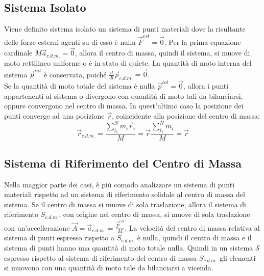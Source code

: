 \documentclass{article}
\numberwithin{equation}{subsection}
\begin{document}
\subsection{Sistema Isolato}
Viene definito sistema isolato un sistema di punti materiali dove la risultante delle 
forze esterni agenti su di esso è nulla $\vec{F}^{est}=\vec{0}$. 
Per la prima equazione cardinale $M\vec{a}_{c.d.m.}=\vec{0}$, allora il centro di massa, quindi il sistema, si muove di moto rettilineo 
uniforme o è in stato di quiete. La quantità di moto interna del sistema $\vec{p}^{int}$ 
è conservata, poiché $\displaystyle\frac{d}{dt}\vec{p}_{c.d.m.}=\vec{0}$.
\\
Se la quantità di moto totale del sistema è nulla $\vec{p}^{tot}=\vec{0}$, allora 
i punti appartenenti al sistema o divergono con quantità di 
moto tali da bilanciarsi, oppure convergono nel centro di 
massa. In quest'ultimo caso la posizione dei punti converge 
ad una posizione $\vec{r}$, coincidente alla posizione del centro di massa:
\begin{equation}
    \vec{r}_{c.d.m.}=\displaystyle\frac{\sum_{i_1}^{N}m_i\vec{r}_i}{M}=\vec{r}\frac{\sum_{i_1}^{N}m_i}{M}=\vec{r}
\end{equation}

\subsection{Sistema di Riferimento del Centro di Massa}
Nella maggior parte dei casi, è più comodo analizzare un sistema di punti materiali rispetto ad un sistema di riferimento solidale al centro di massa del sistema. 
Se il centro di massa si muove di sola traslazione, allora
il sistema di riferimento $S_{c.d.m.}$, con origine nel centro 
di massa, si muove di sola traslazione con un'accellerazione 
$\vec{A}=\vec{a}_{c.d.m.}=\displaystyle\frac{\vec{F}^{est}}{M}$. 
La velocità del centro di massa relativa al sistema di punti espresso rispetto a $S_{c.d.m.}$ è nulla, quindi il centro di massa e il sistema di punti hanno una quantità 
di moto totale nulla. Quindi in un sistema $\mathscr{S}$ espresso rispetto al sistema di riferimento del centro di massa $S_{c.d.m.}$ gli elementi 
si muovono con una quantità di moto tale da bilanciarsi a vicenda. 
\end{document}
